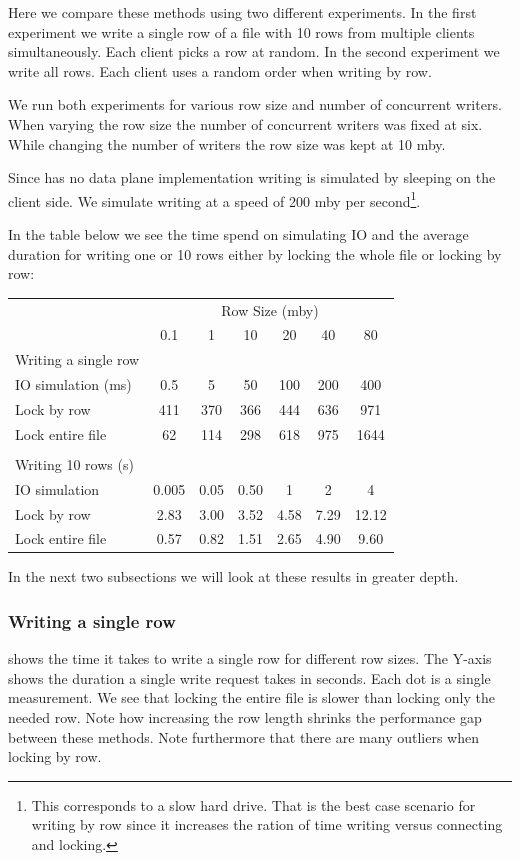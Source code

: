 Here we compare these methods using two different experiments. In the first experiment we write a single row of a file with 10 rows from multiple clients simultaneously. Each client picks a row at random. In the second experiment we write all rows. Each client uses a random order when writing by row.

We run both experiments for various row size and number of concurrent writers. When varying the row size the number of concurrent writers was fixed at six. While changing the number of writers the row size was kept at 10 \ac{mby}.

Since \name{} has no data plane implementation writing is simulated by sleeping on the client side. We simulate writing at a speed of 200 \ac{mby} per second\footnote{This corresponds to a slow hard drive. That is the best case scenario for writing by row since it increases the ration of time writing versus connecting and locking.}.

In the table below we see the time spend on simulating IO and the average duration for writing one or 10 rows either by locking the whole file or locking by row:
%
\begin{tabular}{lcccccc} \toprule
	& \multicolumn{6}{c}{Row Size (\ac{mby})} \\ \cmidrule(r){2-7}
	                   & 0.1 & 1 & 10 & 20 & 40 & 80 \\ \midrule
	Writing a single row  \\ \cmidrule(r){1-1}
	IO simulation (ms) & 0.5          & 5          & 50          & 100         & 200         & 400 \\
	Lock by row & 411 & 370 & 366 & 444 & 636 & 971\\
	Lock entire file & 62 & 114 & 298 & 618 & 975 & 1644 \\
\smallskip \\
	Writing 10 rows (s)\\ \cmidrule(r){1-1}
	IO simulation & 0.005          & 0.05          & 0.50          & 1         & 2         & 4 \\
	Lock by row & 2.83         & 3.00       & 3.52        & 4.58        & 7.29        & 12.12 \\
	Lock entire file & 0.57         & 0.82       & 1.51        & 2.65        & 4.90        & 9.60 \\ \bottomrule
\end{tabular}
%
In the next two subsections we will look at these results in greater depth.
%
\subsubsection{Writing a single row}
 shows the time it takes to write a single row for different row sizes. The Y-axis shows the duration a single write request takes in seconds. Each dot is a single measurement. We see that locking the entire file is slower than locking only the needed row. Note how increasing the row length shrinks the performance gap between these methods. Note furthermore that there are many outliers when locking by row.

